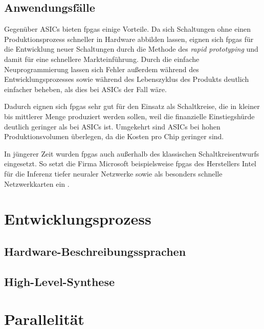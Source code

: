 \subsection{Anwendungsfälle}

Gegenüber ASICs bieten \gls{fpga}s einige Vorteile. Da sich Schaltungen ohne
einen Produktionsprozess schneller in Hardware abbilden lassen, eignen sich
\gls{fpga}s für die Entwicklung neuer Schaltungen durch die Methode des
\textit{rapid prototyping} und damit für eine schnellere Markteinführung. Durch
die einfache Neuprogrammierung lassen sich Fehler außerdem während des
Entwicklungsprozesses sowie während des Lebenszyklus des Produkts deutlich
einfacher beheben, als dies bei ASICs der Fall wäre.
\cite[vgl.][10-1]{hawkins2010}

Dadurch eignen sich \gls{fpga}s sehr gut für den Einsatz als Schaltkreise, die
in kleiner bis mittlerer Menge produziert werden sollen, weil die finanzielle
Einstiegshürde deutlich geringer als bei ASICs ist. Umgekehrt sind ASICs bei
hohen Produktionsvolumen überlegen, da die Kosten pro Chip geringer sind.
\cite[vgl.][10-2]{hawkins2010}

In jüngerer Zeit wurden \gls{fpga}s auch außerhalb des klassischen
Schaltkreisentwurfs eingesetzt. So setzt die Firma Microsoft beispielsweise
\gls{fpga}s des Herstellers Intel für die Inferenz tiefer neuraler Netzwerke
\cite[vgl.][]{fowers2018, chung2018} sowie als besonders schnelle
Netzwerkkarten ein \cite[vgl.][]{firestone2018}.

\section{Entwicklungsprozess}

\subsection{Hardware-Beschreibungssprachen}

\subsection{High-Level-Synthese}

\section{Parallelität}
